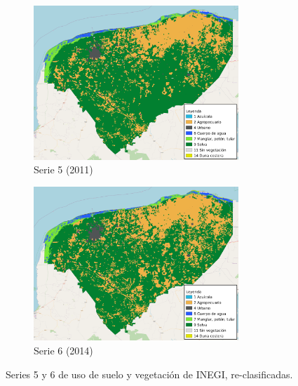\documentclass[12pt,a4paper,oldfontcommands]{article}
\begin{document}
\pagebreak


	\begin{figure}[H]
		\begin{center}
			\begin{subfigure}[r]{1.12\textwidth}
				\includegraphics[width=0.85\textwidth]{./figuras/serie5.png}
				\caption{Serie 5 (2011)}
			\end{subfigure}
			\begin{subfigure}[r]{1.12\textwidth}
				\includegraphics[width=0.85\textwidth]{./figuras/serie6.png}
				\caption{Serie 6 (2014)}
			\end{subfigure}
			
			\caption{Series 5 y 6 de uso de suelo y vegetación de INEGI, re-clasificadas.}
		\end{center}
		\label{fig:series}
	\end{figure}
\end{document}
